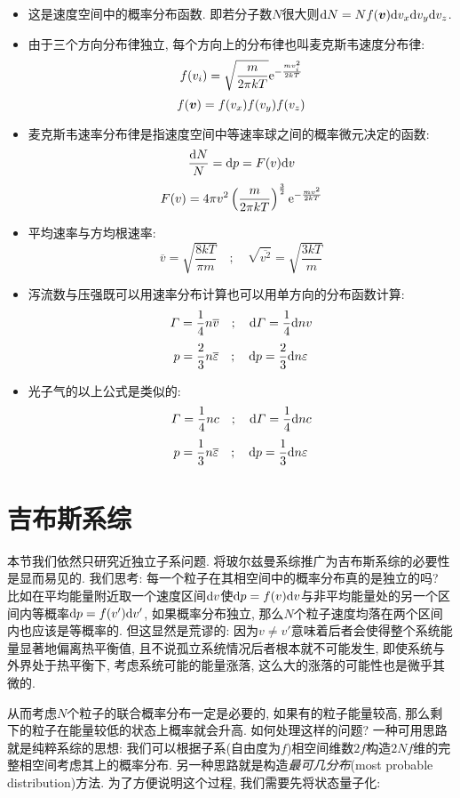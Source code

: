 \begin{itemize}
\item 这是速度空间中的概率分布函数. 即若分子数$N$很大则$\textrm{d} N = Nf(\boldsymbol{v})\textrm{d} v_x\textrm{d} v_y\textrm{d} v_z$.

\item 由于三个方向分布律独立, 每个方向上的分布律也叫麦克斯韦速度分布律:
\[f(v_i)=\sqrt{\frac{m}{2\pi kT}}{\rm e}^{-\frac{mv_i^2}{2kT}}\]
\[f(\boldsymbol{v})=f(v_x)f(v_y)f(v_z)\]

\item 麦克斯韦速率分布律是指速度空间中等速率球之间的概率微元决定的函数:
\[\frac{\textrm{d} N}{N}=\textrm{d} p=F(v)\textrm{d} v \]
\[F(v)=4\pi v^2\left(\frac{m}{2\pi kT}\right)^{\frac{3}{2}}{\rm e}^{-\frac{mv^2}{2kT}}\]

\item 平均速率与方均根速率:
\[\overline{v}=\sqrt{\frac{8kT}{\pi m}}\quad ;\quad \sqrt{\overline{v^2}}=\sqrt{\frac{3kT}{m}}\]

\item 泻流数与压强既可以用速率分布计算也可以用单方向的分布函数计算:
\[\varGamma=\frac{1}{4}n\overline{v}\quad ;\quad \textrm{d} \varGamma=\frac{1}{4}\textrm{d} nv\]
\[p=\frac{2}{3}n\overline{\varepsilon}\quad ;\quad \textrm{d} p=\frac{2}{3}\textrm{d} n\varepsilon\]

\item 光子气的以上公式是类似的:
\[\varGamma=\frac{1}{4}nc\quad ;\quad \textrm{d} \varGamma=\frac{1}{4}\textrm{d} nc\]
\[p=\frac{1}{3}n\overline{\varepsilon}\quad ;\quad \textrm{d} p=\frac{1}{3}\textrm{d} n\varepsilon\]
\end{itemize}



\section{吉布斯系综}

本节我们依然只研究近独立子系问题. 将玻尔兹曼系综推广为吉布斯系综的必要性是显而易见的. 我们思考: 每一个粒子在其相空间中的概率分布真的是独立的吗? 比如在平均能量附近取一个速度区间$\textrm{d} v$使$\textrm{d} p=f(v)\textrm{d} v$与非平均能量处的另一个区间内等概率$\textrm{d} p=f(v')\textrm{d} v'$, 如果概率分布独立, 那么$N$个粒子速度均落在两个区间内也应该是等概率的. 但这显然是荒谬的: 因为$v\neq v'$意味着后者会使得整个系统能量显著地偏离热平衡值, 且不说孤立系统情况后者根本就不可能发生, 即使系统与外界处于热平衡下, 考虑系统可能的能量涨落, 这么大的涨落的可能性也是微乎其微的.

从而考虑$N$个粒子的联合概率分布一定是必要的, 如果有的粒子能量较高, 那么剩下的粒子在能量较低的状态上概率就会升高. 如何处理这样的问题? 一种可用思路就是纯粹系综的思想: 我们可以根据子系(自由度为$f$)相空间维数$2f$构造$2Nf$维的完整相空间考虑其上的概率分布. 另一种思路就是构造\emph{最可几分布}(most probable distribution)方法. 为了方便说明这个过程, 我们需要先将状态量子化:

